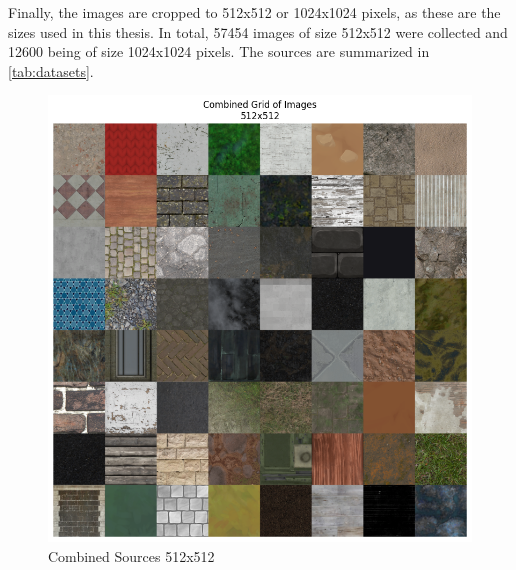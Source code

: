     Finally, the images are cropped to 512x512 or 1024x1024 pixels, as these are the sizes used in this thesis. In total, 57454 images of size 512x512 were collected and 12600 being of size 1024x1024 pixels. The sources are summarized in \autoref{tab:datasets}.


    \begin{figure}[H]
        \centering
        \begin{minipage}{.50\textwidth}
            \centering
            \includegraphics[width=\linewidth]{../code/dataAnalysis/plots/exampleImgs/DataCombined512x.png}
            \caption{Combined Sources 512x512}
            \label{fig:exmapleImgs512}
        \end{minipage}\hfill
        \begin{minipage}{.50\textwidth}
            \centering

\end{minipage}
\end{figure}
